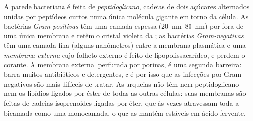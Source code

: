 \begin{proposition}\label{prop:b2:unicellular-diversity:gram}
A parede bacteriana é feita de \emph{peptidoglicano}, cadeias de dois
açúcares alternados unidas por peptídeos curtos numa única molécula
gigante em torno da célula. As bactérias \emph{Gram-positivas} têm
uma camada espessa (\qtyrange{20}{80}{nm}) por fora de uma única
membrana e retêm o cristal violeta da ; as bactérias
\emph{Gram-negativas} têm uma camada fina (alguns nanômetros) entre a
membrana plasmática e uma \emph{membrana externa} cujo folheto externo
é feito de lipopolissacarídeo, e perdem o corante. A membrana
externa, perfurada por porinas, é uma segunda barreira: barra muitos
antibióticos e detergentes, e é por isso que as infecções por
Gram-negativos são mais difíceis de tratar. As arqueias não têm nem
peptidoglicano nem os lipídios ligados por éster de todas as outras
células: suas membranas são feitas de cadeias isoprenoides ligadas
por éter, que às vezes atravessam toda a bicamada como uma monocamada,
o que as mantém estáveis em ácido fervente.
\end{proposition}

